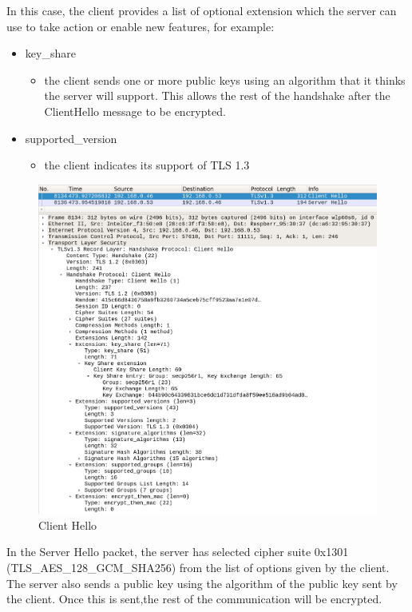 \documentclass[a4paper,12pt]{article}
\begin{document}
In this case, the client provides a list of optional extension which the server can use to take action or enable new features, for example:
\begin{itemize}
\item key\_share 
\begin{itemize}
\item the client sends one or more public keys using an algorithm that it thinks the server will support. This allows the rest of the handshake after the ClientHello message to be encrypted.
\end{itemize}
\item supported\_version
\begin{itemize}
\item the client indicates its support of TLS 1.3
\end{itemize}
\end{itemize}
\begin{figure}[H]
    \centering
    \includegraphics[scale=0.248]{./code/img/client-hello.png}
    \caption{Client Hello}
    
\end{figure}


In the Server Hello packet, the server has selected cipher suite 0x1301 (TLS\_AES\_128\_GCM\_SHA256) from the list of options given by the client.
The server also sends a public key using the algorithm of the public key sent by the client. Once this is sent,the rest of the communication will be encrypted.
\end{document}
